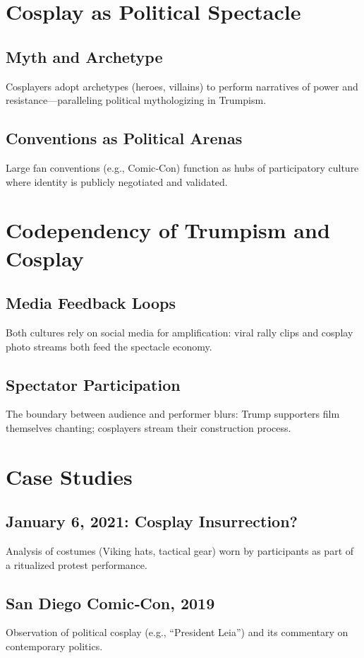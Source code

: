 \documentclass[11pt]{article}
\begin{document}
\section{Cosplay as Political Spectacle}
\subsection{Myth and Archetype}
Cosplayers adopt archetypes (heroes, villains) to perform narratives of power and resistance—paralleling political mythologizing in Trumpism.

\subsection{Conventions as Political Arenas}
Large fan conventions (e.g., Comic‑Con) function as hubs of participatory culture where identity is publicly negotiated and validated.

\clearpage
\section{Codependency of Trumpism and Cosplay}
\subsection{Media Feedback Loops}
Both cultures rely on social media for amplification: viral rally clips and cosplay photo streams both feed the spectacle economy.

\subsection{Spectator Participation}
The boundary between audience and performer blurs: Trump supporters film themselves chanting; cosplayers stream their construction process.

\section{Case Studies}
\subsection{January 6, 2021: Cosplay Insurrection?}
Analysis of costumes (Viking hats, tactical gear) worn by participants as part of a ritualized protest performance.

\subsection{San Diego Comic‑Con, 2019}
Observation of political cosplay (e.g., “President Leia”) and its commentary on contemporary politics.
\end{document}
